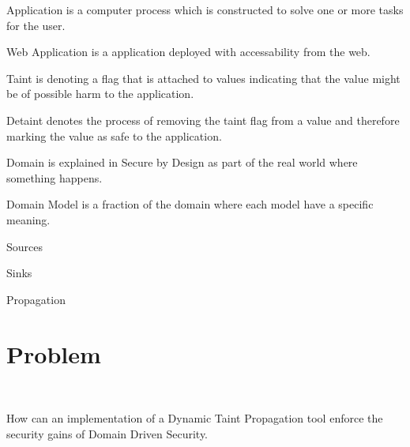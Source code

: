 \begin{definition}{Application} 
	is a computer process which is constructed to solve one or more tasks for the user.
\end{definition}

\begin{definition}{Web Application} 
	is a application deployed with accessability from the web.
\end{definition}

\begin{definition}{Taint}
	is denoting a flag that is attached to values indicating that the value might be of possible harm to the application.
\end{definition}

\begin{definition}{Detaint}
	denotes the process of removing the taint flag from a value and therefore marking the value as safe to the application.
\end{definition}

\begin{definition}{Domain}
	is explained in Secure by Design \parencite{sbd2018} as part of the real world where something happens.
\end{definition}

\begin{definition}{Domain Model}
	is a fraction of the domain where each model have a specific meaning.
\end{definition}

\begin{definition}{Sources}
\end{definition}

\begin{definition}{Sinks}
\end{definition}

\begin{definition}{Propagation}
\end{definition}


\section{Problem}
\hfill \\
\begin{chapquote}{}
	How can an implementation of a Dynamic Taint Propagation tool enforce the security gains of Domain Driven Security.
\end{chapquote}

